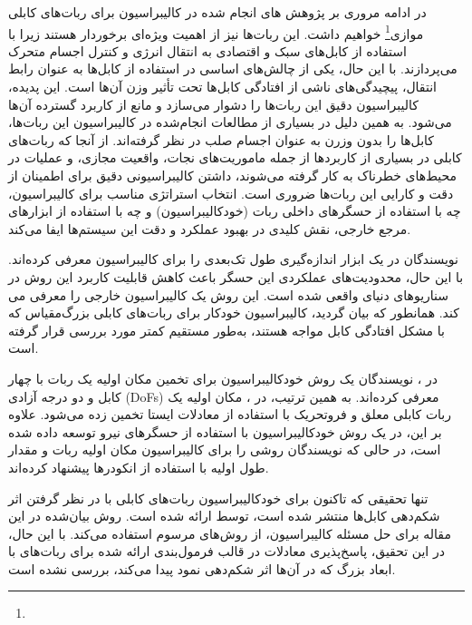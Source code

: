 در ادامه مروری بر پژوهش های انجام شده در کالیبراسیون برای ربات‌های کابلی موازی\footnote{}
خواهیم داشت. این ربات‌ها نیز از اهمیت ویژه‌ای برخوردار هستند زیرا با استفاده از کابل‌های سبک و اقتصادی به انتقال انرژی و کنترل اجسام متحرک می‌پردازند. با این حال، یکی از چالش‌های اساسی در استفاده از کابل‌ها به عنوان رابط انتقال، پیچیدگی‌های ناشی از افتادگی کابل‌ها تحت تأثیر وزن آن‌ها است. این پدیده، کالیبراسیون دقیق این ربات‌ها را دشوار می‌سازد و مانع از کاربرد گسترده آن‌ها می‌شود. به همین دلیل در بسیاری از مطالعات انجام‌شده در کالیبراسیون این ربات‌ها، کابل‌ها را بدون وزرن به عنوان اجسام صلب در نظر گرفته‌اند. از آنجا که ربات‌های کابلی در بسیاری از کاربردها از جمله ماموریت‌های نجات، واقعیت مجازی، و عملیات در محیط‌های خطرناک به کار گرفته می‌شوند، داشتن کالیبراسیونی دقیق برای اطمینان از دقت و کارایی این ربات‌ها ضروری است. انتخاب استراتژی مناسب برای کالیبراسیون، چه با استفاده از حسگرهای داخلی ربات (خودکالیبراسیون) و چه با استفاده از ابزارهای مرجع خارجی، نقش کلیدی در بهبود عملکرد و دقت این سیستم‌ها ایفا می‌کند. 
 
نویسندگان در \cite{jin2018geometric} یک ابزار اندازه‌گیری طول تک‌بعدی را برای کالیبراسیون معرفی کرده‌اند. با این حال، محدودیت‌های عملکردی این حسگر باعث کاهش قابلیت کاربرد این روش در سناریوهای دنیای واقعی شده است. این روش یک کالیبراسیون خارجی را معرفی می کند. همانطور که بیان گردید، کالیبراسیون خودکار برای ربات‌های کابلی بزرگ‌مقیاس که با مشکل افتادگی کابل مواجه هستند، به‌طور مستقیم کمتر مورد بررسی قرار گرفته است. 

در \cite{borgstrom2009nims}، نویسندگان یک روش خودکالیبراسیون برای تخمین مکان اولیه یک ربات با چهار کابل و دو درجه آزادی (DoFs) معرفی کرده‌اند. به همین ترتیب، در \cite{ida2019automatic}، مکان اولیه یک ربات کابلی معلق و فروتحریک با استفاده از معادلات ایستا تخمین زده می‌شود. علاوه بر این، در \cite{pott2013cable_ForceSensorCalib} یک روش خودکالیبراسیون با استفاده از حسگرهای نیرو توسعه داده شده است، در حالی که نویسندگان \cite{darvin2018initial} روشی را برای کالیبراسیون مکان اولیه ربات و مقدار طول اولیه با استفاده از انکودرها پیشنهاد کرده‌اند. 
 
تنها تحقیقی که تاکنون برای خودکالیبراسیون ربات‌های کابلی با در نظر گرفتن اثر شکم‌دهی کابل‌ها منتشر شده است، توسط \cite{an2022all} ارائه شده است. روش بیان‌شده در این مقاله برای حل مسئله کالیبراسیون، از روش‌های مرسوم استفاده می‌کند. با این حال، در این تحقیق، پاسخ‌پذیری معادلات در قالب فرمول‌بندی ارائه شده برای ربات‌های با ابعاد بزرگ که در آن‌ها اثر شکم‌دهی نمود پیدا می‌کند، بررسی نشده است.



